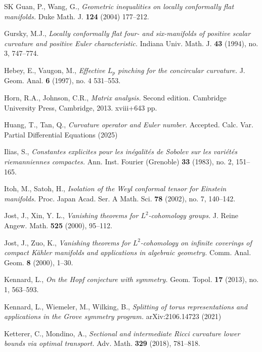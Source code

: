 \documentclass[12pt, twoside]{article}
\theoremstyle{definition}
\numberwithin{equation}{section}
\begin{document}
\begin{thebibliography}{SK}
	Guan, P., Wang, G.,
	\textit{Geometric inequalities on locally conformally flat manifolds.} Duke Math. J. \textbf{124} (2004) 177--212.
	
	
	
	Gursky, M.J.,
	\textit{Locally conformally flat four- and six-manifolds of positive scalar curvature and positive Euler characteristic.}
	Indiana Univ. Math. J. \textbf{43} (1994), no. 3, 747--774.
	
	 Hebey, E., Vaugon, M.,
	 \textit{Effective $L_{p}$ pinching for the concircular curvature.}
	 J. Geom. Anal. \textbf{6} (1997), no. 4 531--553.
	
	
	Horn, R.A., Johnson, C.R.,
	\textit{Matrix analysis.} Second edition. Cambridge University Press, Cambridge, 2013. xviii+643 pp. 
	
	Huang, T., Tan, Q.,
	\textit{Curvature operator and Euler number.}
	Accepted. Calc. Var. Partial Differential Equations (2025)
	
	 Ilias, S.,
	 \textit{Constantes explicites pour les in\'{e}galit\'{e}s de Sobolev sur les vari\'{e}t\'{e}s riemanniennes compactes.}
 Ann. Inst. Fourier (Grenoble) \textbf{33} (1983), no. 2, 151--165. 
	
	Itoh, M., Satoh, H.,
	\textit{ Isolation of the Weyl conformal tensor for Einstein manifolds.} Proc. Japan Acad. Ser. A Math. Sci. \textbf{78} (2002), no. 7, 140--142. 
	
	
	Jost, J., Xin, Y. L.,
	\textit{Vanishing theorems for $L^{2}$-cohomology groups.}
	J. Reine Angew. Math. \textbf{525} (2000), 95--112.
	
	Jost, J., Zuo, K.,
	\textit{Vanishing theorems for $L^{2}$-cohomology on infinite coverings of compact K\"{a}hler manifolds and applications in algebraic geometry.}
	Comm. Anal. Geom. \textbf{8} (2000), 1--30.
	
	Kennard, L.,
	\textit{On the Hopf conjecture with symmetry.}
	Geom. Topol. \textbf{17} (2013), no. 1, 563--593.
	
	Kennard, L., Wiemeler, M., Wilking, B.,
	\textit{Splitting of torus representations and applications in the Grove symmetry program.}
	 arXiv:2106.14723 (2021)
	
	
	
	
	
	Ketterer, C., Mondino, A.,
	\textit{Sectional and intermediate Ricci curvature lower bounds via optimal transport.}
	 Adv. Math. \textbf{329} (2018), 781--818. 
	

\end{thebibliography}
\end{document}
